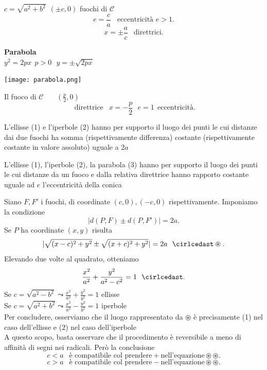 \documentclass[12px]{article}
\begin{document}
  \begin{defi}
	  $c = \sqrt{a^2 + b^2} \ \ (\pm c,0)$ fuochi di $\mathscr{C}$ 
	   \[
		   e = \frac c a \ \ \ \ \text{eccentricità } e>1
	  .\] 
	  \[
		  x = \pm \frac a c \ \ \text{ direttrici}
	  .\] 
  \end{defi}
  \textbf{Parabola}\\
  $y^2 = 2 px \ \ p>0\ \ \ y = \pm\sqrt{2px}$\\
\begin{center}
	\texttt{[image: parabola.png]}
\end{center}
\begin{defi}
	Il fuoco di $\mathscr{C}$ \ \ \ $(\frac p 2 , 0)$
	 \[
		 \text{ direttrice } \ \ x = -\frac  p 2 \ \ \ e = 1 \ \ \text{eccentricità}
	.\] 
\end{defi}
\begin{prop}
	L'ellisse (1) e l'iperbole (2) hanno per supporto il luogo dei punti le cui distanze dai due fuochi ha somma (rispettivamente differenza) costante (rispettivamente costante in valore assoluto) uguale a $2a$
\end{prop}
\begin{prop}
	L'ellisse (1), l'iperbole (2), la parabola (3) hanno per supporto il luogo dei punti le cui distanze da un fuoco e dalla relativa direttrice hanno rapporto costante uguale ad $e$ l'eccentricità della conica
\end{prop}
\begin{dimo}[proposizione 1]
	Siano $F, F'$ i fuochi, di coordinate $(c,0),(-c,0)$ rispettivamente.
	Imponiamo la condizione
	\[
	|d(P,F)\pm d(P,F')| = 2a
	.\] 
	Se $P$ ha  coordinate $(x,y)$ risulta \[
		|\sqrt{(x-c)^2+y^2}\pm\sqrt{(x+c)^2 + y^2}| = 2a \ \ \cirlcedast\circledast
	.\] 
	Elevando due volte al quadrato, otteniamo 
	\[
		\frac{x^2}{a^2} + \frac{y^2}{a^2-c^2} = 1 \ \ \cirlcedast
	.\] 
	Se $c = \sqrt{a^2 - b^2} \leadsto \frac{x^2}{a^2} + \frac{y^2}{b^2} =1$ ellisse\\
	Se $c = \sqrt{a^2 + b^2} \leadsto \frac{x^2}{a^2} - \frac {y^2}{b^2} = 1$ iperbole\\
	Per concludere, osserviamo che il luogo rappresentato da $\circledast$ è precisamente (1) nel caso dell'ellisse e (2) nel caso dell'iperbole\\
	A questo scopo, basta osservare che il procedimento è reversibile a meno di affinità di segni nei radicali. Però la conclusione\\
	\[
		c < a \ \ \text{ è compatibile col prendere} + \text{nell'equazione} \circledast\circledast
	.\] 
	\[
		c > a \ \ \text{ è compatibile col prendere} - \text{nell'equazione} \circledast\circledast
	.\] 
\end{dimo}
\end{document}
